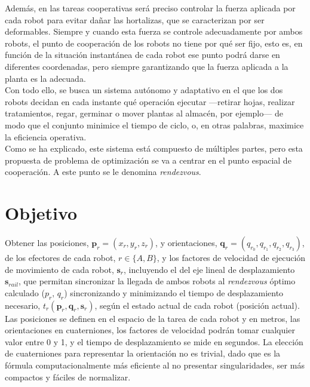 Además, en las tareas cooperativas será preciso controlar la fuerza aplicada 
por cada robot para evitar dañar las hortalizas, que se caracterizan 
por ser deformables. Siempre y cuando esta fuerza se controle adecuadamente 
por ambos robots, el punto de cooperación de los robots no tiene 
por qué ser fijo, esto es, en función de la situación instantánea de 
cada robot ese punto podrá darse en diferentes coordenadas, pero 
siempre garantizando que la fuerza aplicada a la planta es la adecuada. \\


Con todo ello, se busca un sistema autónomo y adaptativo en el que
los dos robots decidan en cada instante qué operación ejecutar
—retirar hojas, realizar tratamientos, regar, germinar o mover 
plantas al almacén, por ejemplo— de modo que el conjunto minimice el tiempo de
ciclo, o, en otras palabras, maximice la eficiencia operativa. \\

Como se ha explicado, este sistema está compuesto de múltiples partes,
pero esta propuesta de problema de optimización se va a centrar en el punto 
espacial de cooperación. A este punto se le denomina \textit{rendezvous}. 

\section*{Objetivo}
Obtener las posiciones, \(\mathbf{p}_r=(x_r,y_r,z_r)\), y orientaciones,
\(\mathbf{q}_r=(q_{r_0},q_{r_1},q_{r_2},q_{r_3})\), de los efectores de cada robot,
$r\in\{A,B\}$,
y los 
factores de velocidad de ejecución de movimiento de cada robot, \(\mathbf{s}_r\), incluyendo el 
del eje lineal de desplazamiento \(\mathbf{s}_{rail}\), que permitan
sincronizar la llegada de ambos robots al \textit{rendezvous} óptimo calculado ($p_r,\,q_r$) 
sincronizando y minimizando el 
tiempo de desplazamiento necesario, $t_{r}(\mathbf{p}_r,\mathbf{q}_r,\mathbf{s}_r)$,
según el estado actual de cada robot (posición actual). \\

Las posiciones se definen en el espacio de la tarea de cada robot y en metros, las 
orientaciones en cuaterniones, los factores de 
velocidad podrán tomar cualquier valor entre 0 y 1, y el tiempo de desplazamiento
se mide en segundos. La elección de cuaterniones para representar la orientación no es trivial,
dado que es la fórmula computacionalmente más 
eficiente \cite{barrientos2007fundamentos} al no presentar singularidades, ser más compactos y 
fáciles de normalizar.\\


